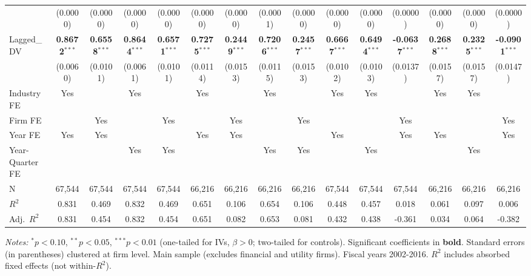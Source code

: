 \documentclass[11pt,a4paper]{article}
\begin{document}
\begin{table}[htbp]
\begin{tabular}{lcccccccccccccc}
 & (0.0000) & (0.0000) & (0.0000) & (0.0000) & (0.0000) & (0.0000) & (0.0001) & (0.0000) & (0.0000) & (0.0000) & (0.0000) & (0.0000) & (0.0000) & (0.0000) \\
Lagged\_DV & \textbf{0.8672}$^{***}$ & \textbf{0.6558}$^{***}$ & \textbf{0.8644}$^{***}$ & \textbf{0.6571}$^{***}$ & \textbf{0.7275}$^{***}$ & \textbf{0.2449}$^{***}$ & \textbf{0.7206}$^{***}$ & \textbf{0.2457}$^{***}$ & \textbf{0.6667}$^{***}$ & \textbf{0.6494}$^{***}$ & \textbf{-0.0637}$^{***}$ & \textbf{0.2688}$^{***}$ & \textbf{0.2325}$^{***}$ & \textbf{-0.0901}$^{***}$ \\
 & (0.0060) & (0.0101) & (0.0061) & (0.0101) & (0.0114) & (0.0153) & (0.0115) & (0.0153) & (0.0102) & (0.0103) & (0.0137) & (0.0157) & (0.0157) & (0.0147) \\
\midrule
Industry FE & Yes &  & Yes &  & Yes &  & Yes &  & Yes & Yes &  & Yes & Yes &  \\
Firm FE &  & Yes &  & Yes &  & Yes &  & Yes &  &  & Yes &  &  & Yes \\
Year FE & Yes & Yes &  &  & Yes & Yes &  &  & Yes &  & Yes & Yes &  & Yes \\
Year-Quarter FE &  &  & Yes & Yes &  &  & Yes & Yes &  & Yes &  &  & Yes &  \\
\midrule
N & 67,544 & 67,544 & 67,544 & 67,544 & 66,216 & 66,216 & 66,216 & 66,216 & 67,544 & 67,544 & 67,544 & 66,216 & 66,216 & 66,216 \\
$R^2$ & 0.831 & 0.469 & 0.832 & 0.469 & 0.651 & 0.106 & 0.654 & 0.106 & 0.448 & 0.457 & 0.018 & 0.061 & 0.097 & 0.006 \\
Adj.~$R^2$ & 0.831 & 0.454 & 0.832 & 0.454 & 0.651 & 0.082 & 0.653 & 0.081 & 0.432 & 0.438 & -0.361 & 0.034 & 0.064 & -0.382 \\
\bottomrule
\end{tabular}
\begin{minipage}{\linewidth}
\vspace{2pt}\scriptsize
\textit{Notes:} $^{*}p<0.10$, $^{**}p<0.05$, $^{***}p<0.01$ (one-tailed for IVs, $\beta > 0$; two-tailed for controls).
 Significant coefficients in \textbf{bold}.
 Standard errors (in parentheses) clustered at firm level.
 Main sample (excludes financial and utility firms). Fiscal years 2002-2016.
 $R^2$ includes absorbed fixed effects (not within-$R^2$).
\end{minipage}
\end{table}
\clearpage
\end{document}
